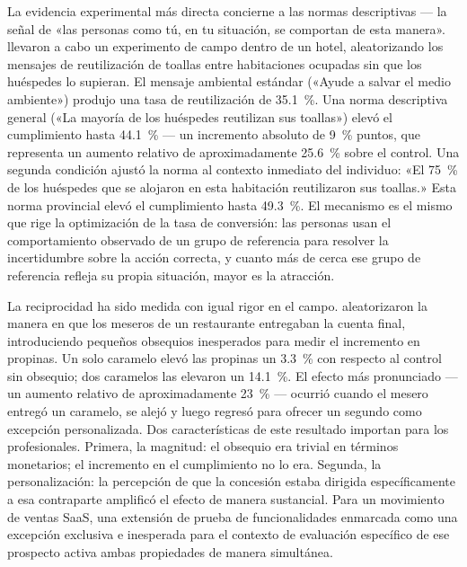La evidencia experimental más directa concierne a las normas descriptivas --- la señal de
«las personas como tú, en tu situación, se comportan de esta manera». \textcite{goldstein2008field}
llevaron a cabo un experimento de campo dentro de un hotel, aleatorizando los mensajes de
reutilización de toallas entre habitaciones ocupadas sin que los huéspedes lo supieran. El
mensaje ambiental estándar («Ayude a salvar el medio ambiente») produjo una tasa de
reutilización de \qty{35.1}{\percent}. Una norma descriptiva general («La mayoría de los
huéspedes reutilizan sus toallas») elevó el cumplimiento hasta \qty{44.1}{\percent} --- un
incremento absoluto de \qty{9}{\percent} puntos, que representa un aumento relativo de
aproximadamente \qty{25.6}{\percent} sobre el control.
Una segunda condición ajustó la norma al contexto inmediato del individuo: «El \qty{75}{\percent}
de los huéspedes que se alojaron en esta habitación reutilizaron sus toallas.» Esta norma
provincial elevó el cumplimiento hasta \qty{49.3}{\percent}.
El mecanismo es el mismo que rige la optimización de la tasa de conversión: las personas usan
el comportamiento observado de un grupo de referencia para resolver la incertidumbre sobre la
acción correcta, y cuanto más de cerca ese grupo de referencia refleja su propia situación,
mayor es la atracción.

La reciprocidad ha sido medida con igual rigor en el campo. \textcite{strohmetz2002field}
aleatorizaron la manera en que los meseros de un restaurante entregaban la cuenta final,
introduciendo pequeños obsequios inesperados para medir el incremento en propinas. Un solo
caramelo elevó las propinas un \qty{3.3}{\percent} con respecto al control sin obsequio; dos
caramelos las elevaron un \qty{14.1}{\percent}.
El efecto más pronunciado --- un aumento relativo de aproximadamente \qty{23}{\percent} ---
ocurrió cuando el mesero entregó un caramelo, se alejó y luego regresó para ofrecer un segundo
como excepción personalizada.
Dos características de este resultado importan para los profesionales. Primera, la magnitud:
el obsequio era trivial en términos monetarios; el incremento en el cumplimiento no lo era.
Segunda, la personalización: la percepción de que la concesión estaba dirigida específicamente
a esa contraparte amplificó el efecto de manera sustancial. Para un movimiento de ventas SaaS,
una extensión de prueba de funcionalidades enmarcada como una excepción exclusiva e inesperada
para el contexto de evaluación específico de ese prospecto activa ambas propiedades de manera
simultánea.

